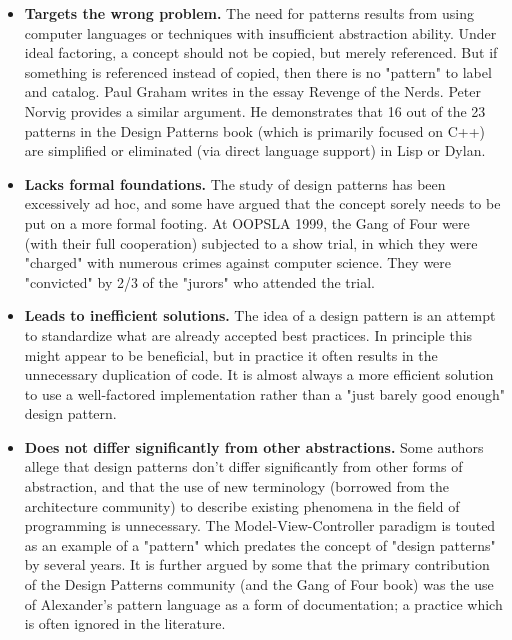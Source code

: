 \begin{itemize}
	\item \textbf{Targets the wrong problem.}
		The need for patterns results from using computer languages or techniques with insufficient abstraction ability. Under ideal factoring, a concept should not be copied, but merely referenced. But if something is referenced instead of copied, then there is no "pattern" to label and catalog. Paul Graham writes in the essay Revenge of the Nerds. Peter Norvig provides a similar argument. He demonstrates that 16 out of the 23 patterns in the Design Patterns book (which is primarily focused on C++) are simplified or eliminated (via direct language support) in Lisp or Dylan.

	\item \textbf{Lacks formal foundations.}
		The study of design patterns has been excessively ad hoc, and some have argued that the concept sorely needs to be put on a more formal footing. At OOPSLA 1999, the Gang of Four were (with their full cooperation) subjected to a show trial, in which they were "charged" with numerous crimes against computer science. They were "convicted" by 2/3 of the "jurors" who attended the trial.

	\item \textbf{Leads to inefficient solutions.}
		The idea of a design pattern is an attempt to standardize what are already accepted best practices. In principle this might appear to be beneficial, but in practice it often results in the unnecessary duplication of code. It is almost always a more efficient solution to use a well-factored implementation rather than a "just barely good enough" design pattern.

	\item \textbf{Does not differ significantly from other abstractions.}
		Some authors allege that design patterns don't differ significantly from other forms of abstraction, and that the use of new terminology (borrowed from the architecture community) to describe existing phenomena in the field of programming is unnecessary. The Model-View-Controller paradigm is touted as an example of a "pattern" which predates the concept of "design patterns" by several years. It is further argued by some that the primary contribution of the Design Patterns community (and the Gang of Four book) was the use of Alexander's pattern language as a form of documentation; a practice which is often ignored in the literature.
\end{itemize}
